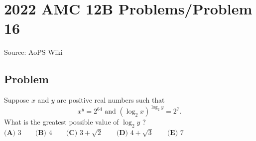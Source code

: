 \documentclass[12pt]{article}
\begin{document}
\section*{{2022 AMC 12B Problems/Problem 16}}
Source: AoPS Wiki

\subsection*{Problem}
Suppose $x$ and $y$ are positive real numbers such that \[x^y=2^{64}\text{ and }(\log_2{x})^{\log_2{y}}=2^{7}.\] What is the greatest possible value of $\log_2{y}$ ? $\textbf{(A) }3 \qquad \textbf{(B) }4 \qquad \textbf{(C) }3+\sqrt{2} \qquad \textbf{(D) }4+\sqrt{3} \qquad \textbf{(E) }7$
\end{document}
